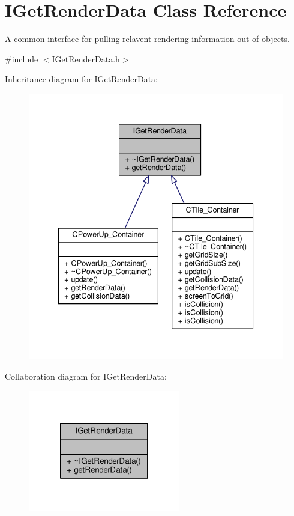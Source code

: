 \hypertarget{classIGetRenderData}{\section{I\-Get\-Render\-Data Class Reference}
\label{classIGetRenderData}
}


A common interface for pulling relavent rendering information out of objects.  




{\ttfamily \#include $<$I\-Get\-Render\-Data.\-h$>$}



Inheritance diagram for I\-Get\-Render\-Data\-:
\nopagebreak
\begin{figure}[H]
\begin{center}
\leavevmode
\includegraphics[width=339pt]{classIGetRenderData__inherit__graph}
\end{center}
\end{figure}


Collaboration diagram for I\-Get\-Render\-Data\-:\nopagebreak
\begin{figure}[H]
\begin{center}
\leavevmode
\includegraphics[width=188pt]{classIGetRenderData__coll__graph}
\end{center}
\end{figure}
